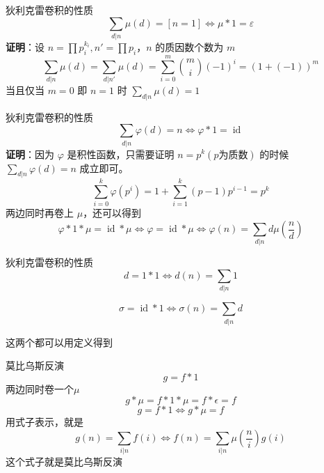 \documentclass[UTF8]{beamer}
\begin{document}
    \begin{frame}{狄利克雷卷积的性质}
        $$
        \sum_{d|n}\mu(d)=[n=1]\iff  \mu \ast 1 =\varepsilon
        $$
        \textbf{证明}：设 $n=\prod p_i^{k_i},n'=\prod p_i$，$n$ 的质因数个数为 $m$\\
        $$
        \sum_{d|n}\mu(d)=\sum_{d|n'}\mu(d)=\sum_{i=0}^{m} \binom{m}{i} (-1)^i=(1+(-1))^m
        $$
        当且仅当 $m=0$ 即 $n=1$ 时 $\sum_{d|n}\mu(d)=1$\\
    \end{frame}
    \begin{frame}{狄利克雷卷积的性质}
        $$
        \sum_{d|n}\varphi(d)=n\iff  \varphi \ast 1 =\operatorname{id}
        $$
        \textbf{证明}：因为 $\varphi$ 是积性函数，只需要证明 $n=p^k(p\text{为质数})$ 的时候 $\sum_{d|n}\varphi(d)=n$ 成立即可。\\
        $$
        \sum_{i=0}^{k}\varphi(p^i)=1+\sum_{i=1}^{k}(p-1)p^{i-1}=p^k
        $$
        \pause
        两边同时再卷上 $\mu $，还可以得到
        $$
        \varphi \ast 1 \ast \mu =\operatorname{id}\ast \mu\iff \varphi=\operatorname{id}\ast \mu
        \iff \varphi(n)=\sum_{d|n}d\mu(\frac{n}{d})
        $$
    \end{frame}
    \begin{frame}{狄利克雷卷积的性质}
        $$
        d=1\ast 1\iff d(n)=\sum_{d|n}1
        $$

        $$
        \sigma=\operatorname{id}\ast 1\iff\sigma(n)=\sum_{d|n}d
        $$

        这两个都可以用定义得到
    \end{frame}
    \begin{frame}{莫比乌斯反演}
        $$
        g=f\ast 1
        $$
        两边同时卷一个$\mu$
        $$
        g\ast \mu=f\ast 1\ast \mu=f\ast \epsilon=f
        $$
        \pause
        $$
        g=f\ast 1\iff g\ast \mu=f
        $$
        用式子表示，就是
        $$
        g(n)=\sum\limits_{i|n}f(i)\iff f(n)=\sum\limits_{i|n}\mu\left(\dfrac{n}{i}\right)g(i)
        $$
        这个式子就是莫比乌斯反演
    \end{frame}
\end{document}
